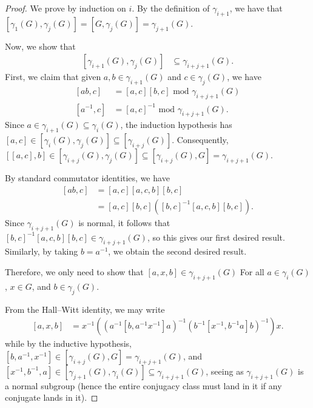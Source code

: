 \documentclass[10pt]{mypackage}
\begin{document}
\begin{proof}
  We prove by induction on $i$. By the definition of $\gamma_{i+1}$, we have that $ \left[ \gamma_1(G),\gamma_j(G) \right] = \left[ G,\gamma_j(G) \right] = \gamma_{j+1}(G) $.

  Now, we show that
  \begin{align*}
    \left[ \gamma_{i+1}(G),\gamma_j(G) \right] &\subseteq \gamma_{i + j + 1}(G).
  \end{align*}
  First, we claim that given $a,b\in \gamma_{i+1}(G)$ and $c\in \gamma_j(G)$, we have
  \begin{align*}
    \left[ ab,c \right] &= \left[ a,c \right]\left[ b,c \right]\text{ mod }\gamma_{i + j + 1}(G)\\
    \left[ a^{-1},c \right] &= \left[ a,c \right]^{-1}\text{ mod }\gamma_{i + j + 1}(G).
  \end{align*}
  Since $a\in \gamma_{i+1}(G)\subseteq \gamma_i(G)$, the induction hypothesis has $\left[ a,c \right]\in \left[ \gamma_{i}(G),\gamma_j(G) \right]\subseteq \left[ \gamma_{i+j}(G) \right]$. Consequently, $\left[ \left[ a,c \right],b \right]\in \left[ \gamma_{i+j}(G),\gamma_j(G) \right]\subseteq \left[ \gamma_{i+j}(G),G \right] = \gamma_{i + j + 1}(G)$.

  By standard commutator identities, we have
  \begin{align*}
    \left[ ab,c \right] &= \left[ a,c \right]\left[ a,c,b \right]\left[ b,c \right]\\
                        &= \left[ a,c \right]\left[ b,c \right]\left( \left[ b,c \right]^{-1}\left[ a,c,b \right] \left[ b,c \right]\right).
  \end{align*}
  Since $\gamma_{i + j + 1}(G)$ is normal, it follows that $\left[ b,c \right]^{-1}\left[ a,c,b \right]\left[ b,c \right]\in \gamma_{i + j + 1}(G)$, so this gives our first desired result. Similarly, by taking $b = a^{-1}$, we obtain the second desired result.

  Therefore, we only need to show that $\left[ a,x,b \right]\in \gamma_{i + j + 1}(G)$ For all $a\in \gamma_i(G)$, $x\in G$, and $b\in \gamma_j(G)$.

  From the Hall--Witt identity, we may write
  \begin{align*}
    \left[ a,x,b \right] &= x^{-1} \left( \left( a^{-1} \left[ b,a^{-1}x^{-1} \right]a \right)^{-1}\left( b^{-1}\left[ x^{-1},b^{-1}a \right]b \right)^{-1} \right)x.
  \end{align*}
  while by the inductive hypothesis, $ \left[ b,a^{-1},x^{-1} \right]\in \left[ \gamma_{i+j}(G),G \right] = \gamma_{i+j+1}(G) $, and $\left[ x^{-1},b^{-1},a \right]\in \left[ \gamma_{j+1}(G),\gamma_i(G) \right]\subseteq \gamma_{i + j + 1}(G)$, seeing as $\gamma_{i + j + 1}(G)$ is a normal subgroup (hence the entire conjugacy class must land in it if any conjugate lands in it).
\end{proof}
\end{document}
